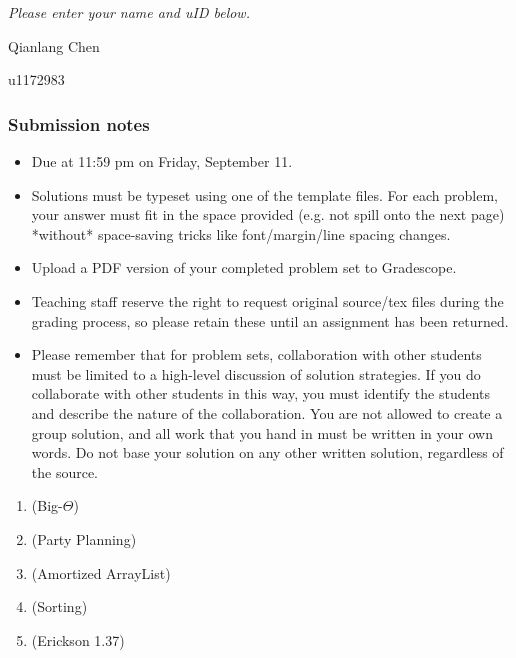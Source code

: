\documentclass{article}
\begin{document}
{\it Please enter your name and uID below.}

\vspace{3em}

 Qianlang Chen
\par
{} u1172983
\par

\vfill

\subsubsection*{Submission notes}
\begin{itemize}
	\item Due at 11:59 pm on Friday, September 11.
	\item Solutions must be typeset using one of the template files. For each problem, your answer must fit in the space provided (e.g. not spill onto the next page) *without* space-saving tricks like font/margin/line spacing changes.
	\item Upload a PDF version of your completed problem set to Gradescope.
	\item Teaching staff reserve the right to request original source/tex files during the grading process, so please retain these until an assignment has been returned.
	\item Please remember that for problem sets, collaboration with other students must be limited to a high-level discussion of solution strategies. If you do collaborate with other students in this way, you must identify the students and describe the nature of the collaboration. You are not allowed to create a group solution, and all work that you hand in must be written in your own words. Do not base your solution on any other written solution, regardless of the source.
\end{itemize}

\pagebreak


\begin{enumerate}

	\item (Big-$\Theta$)


	      \pagebreak

	\item (Party Planning)


	      \pagebreak

	\item (Amortized ArrayList)


	      \pagebreak

	\item (Sorting)


	      \pagebreak

	\item (Erickson 1.37)


\end{enumerate}
\end{document}
